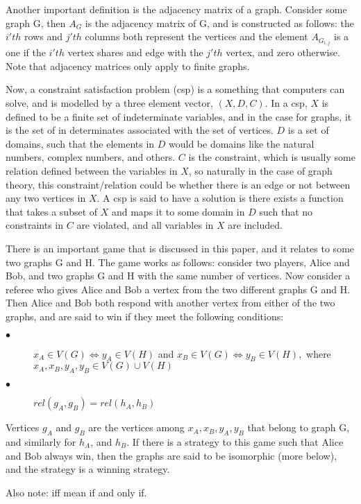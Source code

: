 \documentclass[12pt]{article}
\theoremstyle{definition}
\begin{document}
Another important definition is the adjacency matrix of a graph. Consider some graph G, then $A_G$ is the adjacency matrix of G, and is constructed as follows: the $i'th$ rows and $j'th$ columns both represent the vertices and the element $A_{G_{i, j}}$ is a one if the $i'th$ vertex shares and edge with the $j'th$ vertex, and zero otherwise. Note that adjacency matrices only apply to finite graphs.

Now, a constraint satisfaction problem (csp) is a something that computers can solve, and is modelled by a three element vector, $(X, D, C)$. In a csp, $X$ is defined to be a finite set of indeterminate variables, and in the case for graphs, it is the set of in determinates associated with the set of vertices. $D$ is a set of domains, such that the elements in $D$ would be domains like the natural numbers, complex numbers, and others. $C$ is the constraint, which is usually some relation defined between the variables in $X$, so naturally in the case of graph theory, this constraint/relation could be whether there is an edge or not between any two vertices in $X$. A csp is said to have a solution is there exists a function that takes a subset of $X$ and maps it to some domain in $D$ such that no constraints in $C$ are violated, and all variables in $X$ are included.

There is an important game that is discussed in this paper, and it relates to some two graphs G and H. The game works as follows: consider two players, Alice and Bob, and two graphs G and H with the same number of vertices. Now consider a referee who gives Alice and Bob a vertex from the two different graphs G and H. Then Alice and Bob both respond with another vertex from either of the two graphs, and are said to win if they meet the following conditions:
\begin{description}
  \item[$\bullet$] $x_A \in V(G) \Leftrightarrow y_A \in V(H)$ and  $x_B \in V(G)\Leftrightarrow y_B \in V(H), $ where $x_A, x_B, y_A, y_B \in V(G) \cup V(H)$
  \item[$\bullet$] $rel(g_A, g_B) = rel(h_A, h_B)$
\end{description}
Vertices $g_A$ and $g_B$ are the vertices among $x_A, x_B, y_A, y_B$ that belong to graph G, and similarly for $h_A$, and $h_B$.
If there is a strategy to this game such that Alice and Bob always win, then the graphs are said to be isomorphic (more below), and the strategy is a winning strategy. 

Also note: iff mean if and only if.
\end{document}
